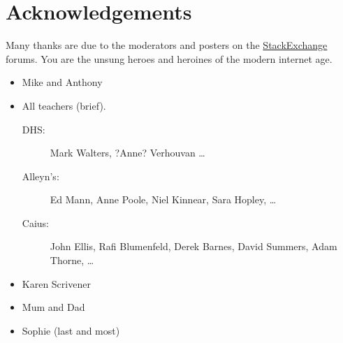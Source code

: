 \chapter*{Acknowledgements}


Many thanks are due to the moderators and posters on the \mbox{\href{http://stackexchange.com/}{StackExchange}} forums. You are the unsung heroes and heroines of the modern internet age.

\begin{itemize}
  \item Mike and Anthony
  \item All teachers (brief). 
    \begin{description}
      \item[DHS:] Mark Walters, ?Anne? Verhouvan \ldots
      \item[Alleyn's:] Ed Mann, Anne Poole, Niel Kinnear, Sara Hopley, \ldots 
      \item[Caius:] John Ellis, Rafi Blumenfeld, Derek Barnes, David Summers, Adam Thorne, \ldots
    \end{description}
  \item Karen Scrivener
  \item Mum and Dad
  \item Sophie (last and most)
\end{itemize}

\cleardoublepage{}
